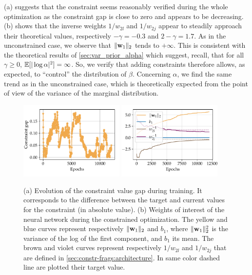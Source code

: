 (a) suggests that the constraint seems reasonably verified during the whole optimization as the constraint gap is close to zero and appears to be decreasing. (b) shows that the inverse weights $1/w_{2l}$ and $1/w_{2j}$ appear to steadily approach their theoretical values, respectively $-\gamma=-0.3$ and $2-\gamma = 1.7$. As in the unconstrained case, we observe that $\|\mathbf{w}_1\|_2$ tends to $+\infty$. This is consistent with the theoretical results of \cref{sec:var_prior_alpha} which suggest, recall, that for all $\gamma\geq0$, $\mathbb{E}[|\log\alpha|^2]=\infty$. So, we verify that adding constraints therefore allows, as expected, to ``control'' the distribution of $\beta$. Concerning $\alpha$, we find the same trend as in the unconstrained case, which is theoretically expected from the point of view of the variance of the marginal distribution.


\begin{figure}[h]
    \centering
    {\includegraphics[width=5.2cm]{figures/constr-frags/constraint gap.pdf}}
    {\includegraphics[width=5.2cm]{figures/constr-frags/weights_constr.pdf}}
    \label{fig:constr-frags:training-constr}
  \caption{(a) Evolution of the constraint value gap during training. It corresponds to the difference between the target and current values for the constraint (in absolute value). (b) Weights of interest of the neural network during the constrained optimization. The yellow and blue curves represent respectively $\|\mathbf{w}_1 \|_2$ and $b_1$, where $\|\mathbf{w}_1 \|_2^2$ is the variance of the log of the first component, and $b_1$ its mean. The brown and violet curves represent respectively $1/w_{2l}$ and $1/w_{2j}$ that are defined in \cref{sec:constr-frags:architecture}. In same color dashed line are plotted their target value.}
\end{figure}

